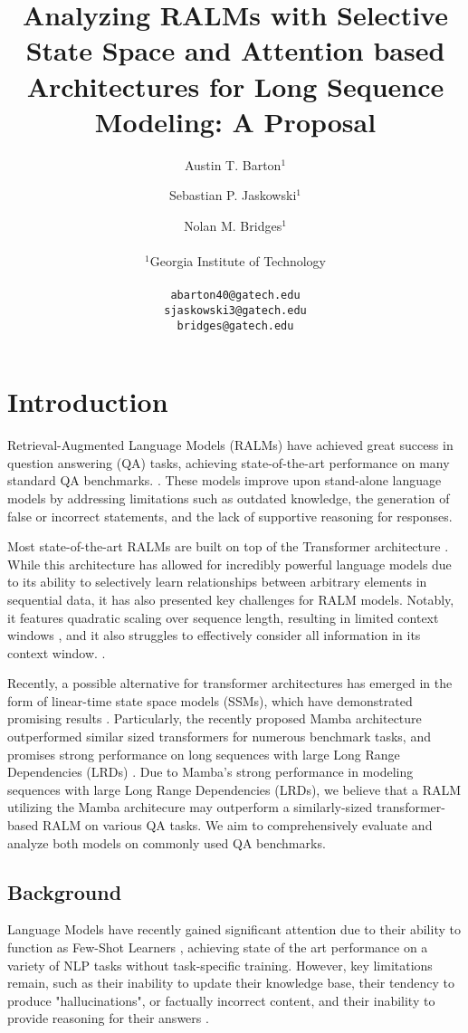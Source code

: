 \documentclass[11pt]{article}
\title{Analyzing RALMs with Selective State Space and Attention based Architectures for Long Sequence Modeling: A Proposal}
\author{Austin T. Barton$^1$ \and Sebastian P. Jaskowski$^1$ \and Nolan M. Bridges$^1$ \\
        \\
         $^1$Georgia Institute of Technology \\ 
         \\ 
         \texttt{abarton40@gatech.edu} \\ \texttt{sjaskowski3@gatech.edu} \\ \texttt{bridges@gatech.edu}}
\begin{document}
\maketitle

\section{Introduction}
Retrieval-Augmented Language Models (RALMs) have achieved great success in question answering (QA) tasks, achieving state-of-the-art performance on many standard QA benchmarks. \cite{lewis2021retrievalaugmented, gao2024retrievalaugmented}. These models improve upon stand-alone language models by addressing limitations such as outdated knowledge, the generation of false or incorrect statements, and the lack of supportive reasoning for responses. 

Most state-of-the-art RALMs are built on top of the Transformer architecture \cite{vaswani2023attention}. While this architecture has allowed for incredibly powerful language models due to its ability to selectively learn relationships between arbitrary elements in sequential data, it has also presented key challenges for RALM models. Notably, it features quadratic scaling over sequence length, resulting in limited context windows \cite{xu2024retrieval}, and it also struggles to effectively consider all information in its context window. \cite{liu2023lost}.

Recently, a possible alternative for transformer architectures has emerged in the form of linear-time state space models (SSMs), which have demonstrated promising results \cite{gu2022, gu2021combining}. Particularly, the recently proposed Mamba architecture outperformed similar sized transformers for numerous benchmark tasks, and promises strong performance on long sequences with large Long Range Dependencies (LRDs) \cite{gu2023mamba}. Due to Mamba's strong performance in modeling sequences with large Long Range Dependencies (LRDs), we believe that a RALM utilizing the Mamba architecure may outperform a similarly-sized transformer-based RALM on various QA tasks. We aim to comprehensively evaluate and analyze both models on commonly used QA benchmarks.
 
\subsection{Background}
Language Models have recently gained significant attention due to their ability to function as Few-Shot Learners \cite{brown2020language}, achieving state of the art performance on a variety of NLP tasks without task-specific training. However, key limitations remain, such as their inability to update their knowledge base, their tendency to produce "hallucinations", or factually incorrect content, and their inability to provide reasoning for their answers \cite{lewis2021retrievalaugmented, huang2023survey}. 
\end{document}
